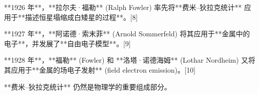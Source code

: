 **1926 年**，**拉尔夫·福勒** (Ralph Fowler) 率先将**费米–狄拉克统计** 应用于**描述恒星塌缩成白矮星的过程**。[8]  

**1927 年**，**阿诺德·索末菲** (Arnold Sommerfeld) 将其应用于**金属中的电子**，并发展了**自由电子模型**。[9]  

**1928 年**，**福勒** (Fowler) 和 **洛塔·诺德海姆** (Lothar Nordheim) 又将其应用于**金属的场电子发射** (field electron emission)。[10]  

**费米–狄拉克统计** 仍然是物理学的重要组成部分。